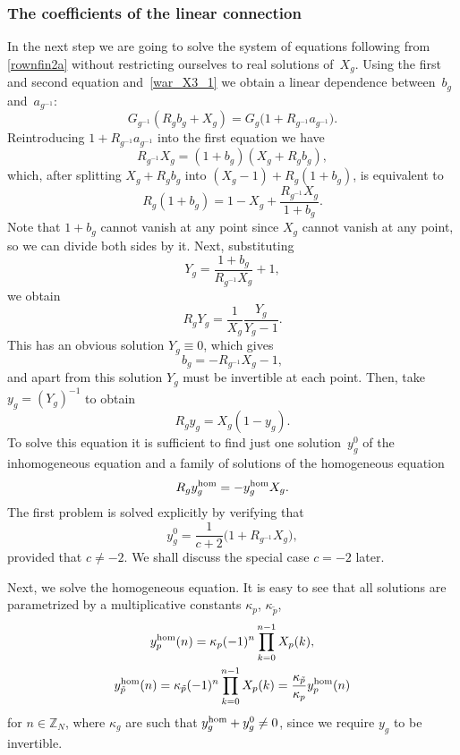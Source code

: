 \documentclass[10pt,a4paper]{amsart}
\numberwithin{equation}{section}
\newcommand{\ip}{{\tilde{p}}}
\begin{document}
\subsubsection{The coefficients of the linear connection}
In the next step we are going to solve the system of equations following from
\eqref{rownfin2a} without restricting ourselves to real solutions of~$X_g$.
Using the first and second equation and~\eqref{war_X3_1} we
obtain a linear dependence between~$b_g$ and~$a_{g^{-1}}$:
\begin{equation*}
G_{g^{-1}} ( R_g b_g + X_g ) = G_g \big( 1 + R_{g^{-1}} a_{g^{-1}} \big) .
\end{equation*}
Reintroducing $1 + R_{g^{-1}} a_{g^{-1}}$ into the first equation we have
\begin{equation}\label{iksy_b}
R_{g^{-1}} X_g = (1+b_g)(X_g +R_g b_g),
\end{equation}
which, after splitting $X_g +R_g b_g$ into $(X_g - 1) + R_g(1 + b_g)$, is equivalent to
\[
R_g(1+b_g)=1 - X_g + \frac{R_{g^{-1}}X_g}{1+b_g}.
\]
Note that $1+b_g$ cannot vanish at any point since $X_g$ cannot vanish at any point, so we can divide both
sides by it. Next, substituting
\[ Y_g = \frac{1+ b_g}{R_{g^{-1}}X_g} +1, \]
we obtain
\[
R_g Y_g = \frac{1}{X_g} \frac{Y_g}{Y_g-1}.
\]
This has an obvious solution $Y_g \equiv 0$, which gives
\[
b_g = - R_{g^{-1}}X_g -1,
\]
and apart from this solution $Y_g$ must be invertible at each point. Then, take
$y_g = (Y_g)^{-1}$ to obtain
\[ R_g y_g =X_{g} (1-y_g ). \]
To solve this equation it is sufficient to find just one solution~$y_g^0$ of the inhomogeneous equation
and a family of solutions of the homogeneous equation
\[
R_g y_g^{{\rm hom}} = - y_g^{{\rm hom}} X_{g}.
\]
The first problem is solved explicitly by verifying that
\[
y_g^0 = \frac{1}{c+2}\big(1+R_{g^{-1}}X_g\big),
\]
provided that $c\neq -2$. We shall discuss the special case $c=-2$ later.

Next, we solve the homogeneous equation. It is easy to see that all solutions are parametrized by a multiplicative constants $\kappa_p$, $\kappa_{\ip}$,
\begin{gather}
y_p^{{\rm hom}}(n) = \kappa_p (-1)^n \prod_{k=0}^{n-1} X_p(k),\label{yhom}\\
y_{\ip}^{{\rm hom}}(n) = \kappa_{\ip} (-1)^n \prod_{k=0}^{n-1} X_p(k) = \frac{\kappa_{\ip}}{\kappa_{p}} y_p^{{\rm hom}}(n)\nonumber
\end{gather}
for $n \in \mathbb{Z}_N$, where $\kappa_g$ are such that $y_g^{\rm hom}+y_g^0\neq 0$, since we require $y_g$ to be invertible.
\end{document}
